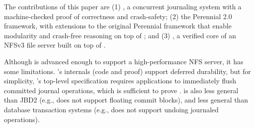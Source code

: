 
The contributions of this paper are (1) \txn, a concurrent
journaling system with a machine-checked proof of correctness and
crash-safety; (2) the Perennial 2.0 framework, with extensions to the original
Perennial framework that enable modularity and crash-free reasoning on top of \txn;
and (3) \simplenfs, a verified core of an NFSv3 file server built on
top of \txn.

Although \txn is advanced enough to support a high-performance NFS
server, it has some limitations.  \txn's internals (code and proof)
support deferred durability, but for simplicity, \txn's top-level
specification requires applications to immediately flush committed
journal operations, which is sufficient to prove \simplenfs.  \txn is also
less general than JBD2 (e.g., \txn does not support floating commit
blocks), and less general than database transaction systems (e.g.,
\txn does not support undoing journaled operations).

